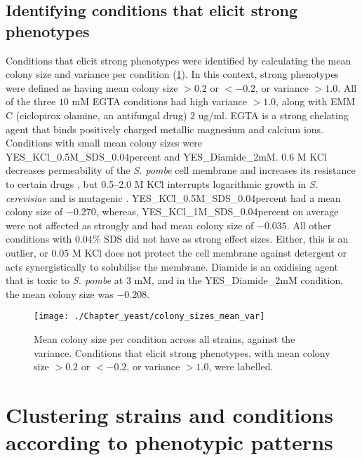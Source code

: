 \subsection{Identifying conditions that elicit strong phenotypes}

Conditions that elicit strong phenotypes were identified by calculating the mean colony size and variance per condition (\ref{fig:colony_sizes_mean_var}). In this context, strong phenotypes were defined as having mean colony size $> 0.2$ or $< -0.2$, or variance $> 1.0$. All of the three $10$ mM EGTA conditions had high variance $> 1.0$, along with EMM C (ciclopirox olamine, an antifungal drug) $2$ ug/ml. EGTA is a strong chelating agent that binds positively charged metallic magnesium and calcium ions. Conditions with small mean colony sizes were YES\_KCl\_0.5M\_SDS\_0.04percent and YES\_Diamide\_2mM.
$0.6$ M KCl decreases permeability of the \emph{S. pombe} cell membrane and increases its resistance to certain drugs \cite{Alao2015}, but \numrange{0.5}{2.0} M KCl interrupts logarithmic growth in \emph{S. cerevisiae} and is mutagenic \cite{Parker1990}. YES\_KCl\_0.5M\_SDS\_0.04percent had a mean colony size of $-0.270$, whereas, YES\_KCl\_1M\_SDS\_0.04percent on average were not affected as strongly and had mean colony size of $-0.035$. All other conditions with $0.04\%$ SDS did not have as strong effect sizes. Either, this is an outlier, or $0.05$ M KCl does not protect the cell membrane against detergent or acts synergistically to solubilise the membrane. Diamide is an oxidising agent that is toxic to \emph{S. pombe} at $3$ mM, and in the YES\_Diamide\_2mM condition, the mean colony size was $-0.208$.

\begin{figure}[!hbt]
    \centering
    \texttt{[image: ./Chapter\_yeast/colony\_sizes\_mean\_var]}
    \caption{%
        Mean colony size per condition across all strains, against the variance.
        Conditions that elicit strong phenotypes, with mean colony size $>0.2$ or $< -0.2$, or variance $>1.0$, were labelled.
    }
    \label{fig:colony_sizes_mean_var}
\end{figure}

\section{Clustering strains and conditions according to phenotypic patterns}


